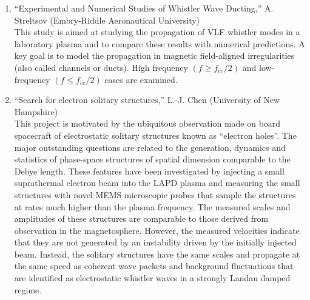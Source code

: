 \documentclass[11pt]{article}
\begin{document}
\begin{enumerate}
\item ``Experimental and Numerical Studies of Whistler Wave Ducting,''
  A. Streltsov (Embry-Riddle Aeronautical University)\\ This study is
  aimed at studying the propagation of VLF whistler modes in a
  laboratory plasma and to compare these results with numerical
  predictions. A key goal is to model the propagation in magnetic
  field-aligned irregularities (also called channels or ducts). High
  frequency $(f \ge f_{ce}/2)$ and low-frequency $(f \le f_{ce}/2)$
  cases are examined.




\item ``Search for electron solitary structures,'' L.-J. Chen
  (University of New Hampshire)\\
This project is motivated by the ubiquitous observation made on board
spacecraft of electrostatic solitary structures known as ``electron
holes''. The major outstanding questions are related to the generation,
dynamics and statistics of phase-space structures of spatial dimension
comparable to the Debye length. These features have been investigated
by injecting a small suprathermal electron beam into the LAPD plasma
and measuring the small structures with novel MEMS microscopic probes
that sample the structures at rates much higher than the plasma
frequency. The measured scales and amplitudes of these structures are
comparable to those derived from observation in the
magnetosphere. However, the measured velocities indicate that they are
not generated by an instability driven by the initially injected
beam. Instead, the solitary structures have the same scales and
propagate at the same speed as coherent wave packets and background
fluctuations that are  identified as electrostatic
whistler waves in a strongly Landau damped regime.



\end{enumerate}
\end{document}
